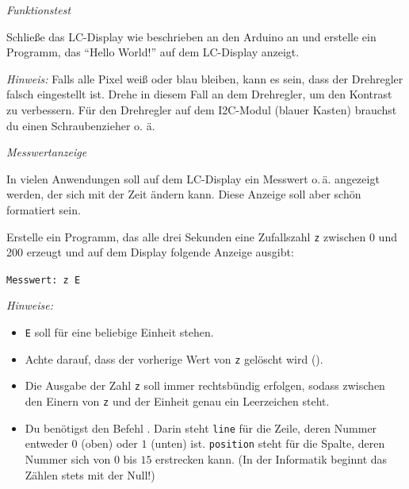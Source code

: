 \bigskip
\begin{aufgabe}\emph{Funktionstest}
	
	Schließe das LC-Display wie beschrieben an den Arduino an und erstelle ein Programm, das \enquote{Hello World!} auf dem LC-Display anzeigt.
	
	\emph{Hinweis:} Falls alle Pixel weiß oder blau bleiben, kann es sein, dass der Drehregler falsch eingestellt ist. Drehe in diesem Fall an dem Drehregler, um den Kontrast zu verbessern. Für den Drehregler auf dem I2C-Modul (blauer Kasten) brauchst du einen Schraubenzieher o. ä.
\end{aufgabe}
%		
%		

\begin{aufgabe} \emph{Messwertanzeige}
	
	In vielen Anwendungen soll auf dem LC-Display ein Messwert o.\,ä. angezeigt werden, der sich mit der Zeit ändern kann. Diese Anzeige soll aber schön formatiert sein.
	
	Erstelle ein Programm, das alle drei Sekunden eine Zufallszahl \texttt{z} zwischen 0 und 200 erzeugt und auf dem Display folgende Anzeige ausgibt:
	
	\begin{center}
		\texttt{Messwert: z E}
	\end{center}
	
	\emph{Hinweise:}
	\begin{itemize}[itemsep=0mm, parsep=0mm]
		\item \texttt{E} soll für eine beliebige Einheit stehen.
		\item Achte darauf, dass der vorherige Wert von \texttt{z} gelöscht wird ().
		\item Die Ausgabe der Zahl \texttt{z} soll immer rechtsbündig erfolgen, sodass zwischen den Einern von \texttt{z} und der Einheit genau ein Leerzeichen steht.
		\item Du benötigst den Befehl . Darin steht \texttt{line} für die Zeile, deren Nummer entweder $0$ (oben) oder $1$ (unten) ist. \texttt{position} steht für die Spalte, deren Nummer sich von $0$ bis $15$ erstrecken kann. (In der Informatik beginnt das Zählen stets mit der Null!)		
	\end{itemize}
\end{aufgabe}

